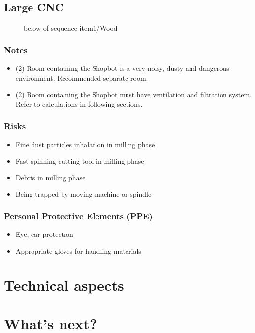 \documentclass[a4paper,12pt,titlepage]{article}
\begin{document}
\subsection{Large CNC}
\begin{figure}[h]

\centering
{}
{below of sequence-item1/{Wood}}
\vspace{1cm}
\end{figure}
\subsubsection*{Notes}
\begin{itemize}
\item (2) Room containing the Shopbot is a very noisy, dusty and dangerous environment. Recommended separate room.
\item (2) Room containing the Shopbot must have ventilation and filtration system. Refer to calculations in following sections.
\end{itemize}
\subsubsection*{Risks}
\begin{itemize}
\item Fine dust particles inhalation in milling phase
\item Fast spinning cutting tool in milling phase
\item Debris in milling phase
\item Being trapped by moving machine or spindle
\end{itemize}
\subsubsection*{Personal Protective Elements (PPE)}
\begin{itemize}
\item Eye, ear protection
\item Appropriate gloves for handling materials 
\end{itemize}

\section{Technical aspects}

\section{What's next?}
\end{document}
